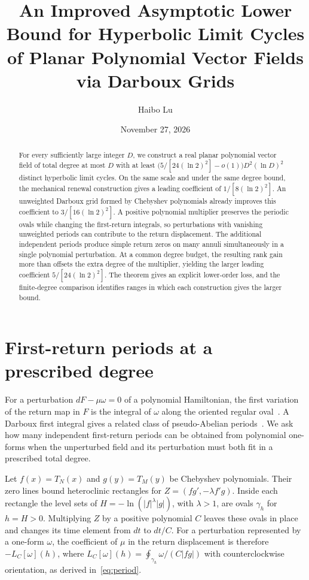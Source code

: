 \documentclass[11pt,a4paper]{amsart}
\title[Hyperbolic Limit Cycles via Darboux Grids]{An Improved Asymptotic Lower Bound for Hyperbolic Limit Cycles of Planar Polynomial Vector Fields via Darboux Grids}
\author{Haibo Lu}
\date{November 27, 2026}
\numberwithin{equation}{section}
\begin{document}
\begin{abstract}
For every sufficiently large integer \(D\), we construct a real planar polynomial vector field of total degree at most \(D\) with at least \(\bigl(5/[24(\ln 2)^2]-o(1)\bigr)D^2(\ln D)^2\) distinct hyperbolic limit cycles. On the same scale and under the same degree bound, the mechanical renewal construction gives a leading coefficient of \(1/[8(\ln 2)^2]\). An unweighted Darboux grid formed by Chebyshev polynomials already improves this coefficient to \(3/[16(\ln 2)^2]\). A positive polynomial multiplier preserves the periodic ovals while changing the first-return integrals, so perturbations with vanishing unweighted periods can contribute to the return displacement. The additional independent periods produce simple return zeros on many annuli simultaneously in a single polynomial perturbation. At a common degree budget, the resulting rank gain more than offsets the extra degree of the multiplier, yielding the larger leading coefficient \(5/[24(\ln 2)^2]\). The theorem gives an explicit lower-order loss, and the finite-degree comparison identifies ranges in which each construction gives the larger bound.
\end{abstract}
\maketitle

\section{First-return periods at a prescribed degree}

For a perturbation \(dF-\mu\omega=0\) of a polynomial Hamiltonian, the first variation of the return map in \(F\) is the integral of \(\omega\) along the oriented regular oval~\cite[\S1, (1.1)--(1.3)]{gavrilov}. A Darboux first integral gives a related class of pseudo-Abelian periods~\cite[\S1]{firstdarboux}. We ask how many independent first-return periods can be obtained from polynomial one-forms when the unperturbed field and its perturbation must both fit in a prescribed total degree.

Let \(f(x)=T_N(x)\) and \(g(y)=T_M(y)\) be Chebyshev polynomials. Their zero lines bound heteroclinic rectangles for \(Z=(fg',-\lambda f'g)\). Inside each rectangle the level sets of \(H=-\ln(|f|^\lambda|g|)\), with \(\lambda>1\), are ovals \(\gamma_h\) for \(h=H>0\). Multiplying \(Z\) by a positive polynomial \(C\) leaves these ovals in place and changes its time element from \(dt\) to \(dt/C\). For a perturbation represented by a one-form \(\omega\), the coefficient of \(\mu\) in the return displacement is therefore \(-L_C[\omega](h)\), where \(L_C[\omega](h)=\oint_{\gamma_h}\omega/(C|fg|)\) with counterclockwise orientation, as derived in~\eqref{eq:period}.
\end{document}
